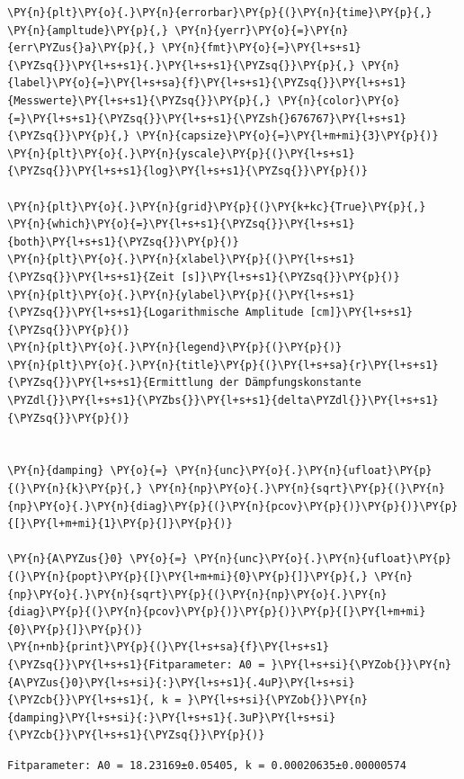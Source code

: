 \begin{tcolorbox}[breakable, size=fbox, boxrule=1pt, pad at break*=1mm,colback=cellbackground, colframe=cellborder]
\begin{Verbatim}[commandchars=\\\{\}]
\PY{n}{plt}\PY{o}{.}\PY{n}{errorbar}\PY{p}{(}\PY{n}{time}\PY{p}{,} \PY{n}{ampltude}\PY{p}{,} \PY{n}{yerr}\PY{o}{=}\PY{n}{err\PYZus{}a}\PY{p}{,} \PY{n}{fmt}\PY{o}{=}\PY{l+s+s1}{\PYZsq{}}\PY{l+s+s1}{.}\PY{l+s+s1}{\PYZsq{}}\PY{p}{,} \PY{n}{label}\PY{o}{=}\PY{l+s+sa}{f}\PY{l+s+s1}{\PYZsq{}}\PY{l+s+s1}{Messwerte}\PY{l+s+s1}{\PYZsq{}}\PY{p}{,} \PY{n}{color}\PY{o}{=}\PY{l+s+s1}{\PYZsq{}}\PY{l+s+s1}{\PYZsh{}676767}\PY{l+s+s1}{\PYZsq{}}\PY{p}{,} \PY{n}{capsize}\PY{o}{=}\PY{l+m+mi}{3}\PY{p}{)}
\PY{n}{plt}\PY{o}{.}\PY{n}{yscale}\PY{p}{(}\PY{l+s+s1}{\PYZsq{}}\PY{l+s+s1}{log}\PY{l+s+s1}{\PYZsq{}}\PY{p}{)}

\PY{n}{plt}\PY{o}{.}\PY{n}{grid}\PY{p}{(}\PY{k+kc}{True}\PY{p}{,} \PY{n}{which}\PY{o}{=}\PY{l+s+s1}{\PYZsq{}}\PY{l+s+s1}{both}\PY{l+s+s1}{\PYZsq{}}\PY{p}{)}
\PY{n}{plt}\PY{o}{.}\PY{n}{xlabel}\PY{p}{(}\PY{l+s+s1}{\PYZsq{}}\PY{l+s+s1}{Zeit [s]}\PY{l+s+s1}{\PYZsq{}}\PY{p}{)}
\PY{n}{plt}\PY{o}{.}\PY{n}{ylabel}\PY{p}{(}\PY{l+s+s1}{\PYZsq{}}\PY{l+s+s1}{Logarithmische Amplitude [cm]}\PY{l+s+s1}{\PYZsq{}}\PY{p}{)}
\PY{n}{plt}\PY{o}{.}\PY{n}{legend}\PY{p}{(}\PY{p}{)}
\PY{n}{plt}\PY{o}{.}\PY{n}{title}\PY{p}{(}\PY{l+s+sa}{r}\PY{l+s+s1}{\PYZsq{}}\PY{l+s+s1}{Ermittlung der Dämpfungskonstante \PYZdl{}}\PY{l+s+s1}{\PYZbs{}}\PY{l+s+s1}{delta\PYZdl{}}\PY{l+s+s1}{\PYZsq{}}\PY{p}{)}


\PY{n}{damping} \PY{o}{=} \PY{n}{unc}\PY{o}{.}\PY{n}{ufloat}\PY{p}{(}\PY{n}{k}\PY{p}{,} \PY{n}{np}\PY{o}{.}\PY{n}{sqrt}\PY{p}{(}\PY{n}{np}\PY{o}{.}\PY{n}{diag}\PY{p}{(}\PY{n}{pcov}\PY{p}{)}\PY{p}{)}\PY{p}{[}\PY{l+m+mi}{1}\PY{p}{]}\PY{p}{)}

\PY{n}{A\PYZus{}0} \PY{o}{=} \PY{n}{unc}\PY{o}{.}\PY{n}{ufloat}\PY{p}{(}\PY{n}{popt}\PY{p}{[}\PY{l+m+mi}{0}\PY{p}{]}\PY{p}{,} \PY{n}{np}\PY{o}{.}\PY{n}{sqrt}\PY{p}{(}\PY{n}{np}\PY{o}{.}\PY{n}{diag}\PY{p}{(}\PY{n}{pcov}\PY{p}{)}\PY{p}{)}\PY{p}{[}\PY{l+m+mi}{0}\PY{p}{]}\PY{p}{)}
\PY{n+nb}{print}\PY{p}{(}\PY{l+s+sa}{f}\PY{l+s+s1}{\PYZsq{}}\PY{l+s+s1}{Fitparameter: A0 = }\PY{l+s+si}{\PYZob{}}\PY{n}{A\PYZus{}0}\PY{l+s+si}{:}\PY{l+s+s1}{.4uP}\PY{l+s+si}{\PYZcb{}}\PY{l+s+s1}{, k = }\PY{l+s+si}{\PYZob{}}\PY{n}{damping}\PY{l+s+si}{:}\PY{l+s+s1}{.3uP}\PY{l+s+si}{\PYZcb{}}\PY{l+s+s1}{\PYZsq{}}\PY{p}{)}
\end{Verbatim}
\end{tcolorbox}

    \begin{Verbatim}[commandchars=\\\{\}]
Fitparameter: A0 = 18.23169±0.05405, k = 0.00020635±0.00000574
    \end{Verbatim}

